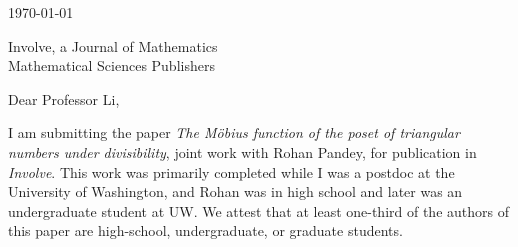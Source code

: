 \documentclass[12pt]{article}
\begin{document}
\vspace*{-2.2cm}
\noindent
\hspace{-0.5cm}

\bigskip
\medskip

\noindent
\today
\vspace{0.4cm}

{\noindent 
Involve, a Journal of Mathematics \\ 
Mathematical Sciences Publishers} %


\vspace{1.2cm}

\noindent
{Dear Professor Li,}

\bigskip
\noindent
I am submitting the paper
\textit{The M\"{o}bius function of the poset of triangular numbers under divisibility},
joint work with Rohan Pandey,
for publication in \textit{Involve}.
This work was primarily completed while I was a postdoc at the University of Washington, and Rohan was in high school and later was an undergraduate student at UW.
We attest that at least one-third of the authors of this paper are high-school, undergraduate, or graduate students.
\end{document}

